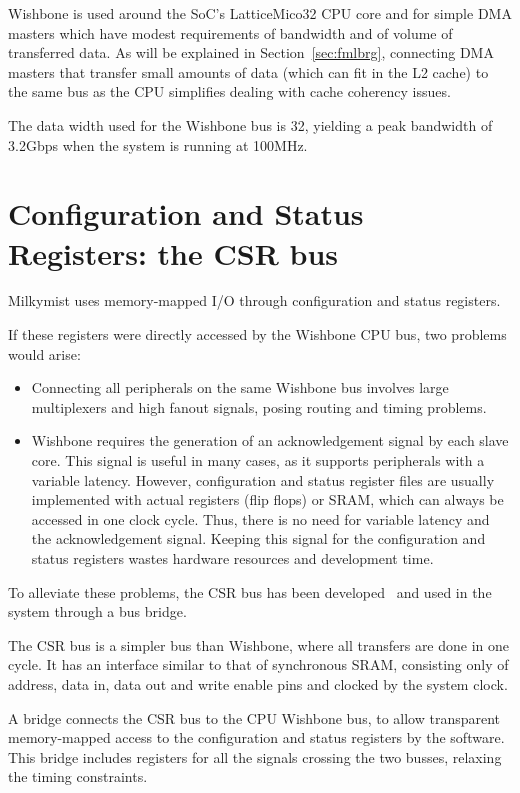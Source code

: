\documentclass[a4paper,11pt]{kthesis}
\begin{document}
Wishbone is used around the SoC's LatticeMico32 CPU core and for simple DMA masters which have modest requirements of bandwidth and of volume of transferred data. As will be explained in Section~\ref{sec:fmlbrg}, connecting DMA masters that transfer small amounts of data (which can fit in the L2 cache) to the same bus as the CPU simplifies dealing with cache coherency issues.

The data width used for the Wishbone bus is 32, yielding a peak bandwidth of 3.2Gbps when the system is running at 100MHz.

\section{Configuration and Status Registers: the CSR bus}
Milkymist uses memory-mapped I/O through configuration and status registers.

If these registers were directly accessed by the Wishbone CPU bus, two problems would arise:
\begin{itemize}
\item Connecting all peripherals on the same Wishbone bus involves large multiplexers and high fanout signals, posing routing and timing problems.
\item Wishbone requires the generation of an acknowledgement signal by each slave core. This signal is useful in many cases, as it supports peripherals with a variable latency. However, configuration and status register files are usually implemented with actual registers (flip flops) or SRAM, which can always be accessed in one clock cycle. Thus, there is no need for variable latency and the acknowledgement signal. Keeping this signal for the configuration and status registers wastes hardware resources and development time.
\end{itemize}

To alleviate these problems, the CSR bus has been developed~\cite{csr} and used in the system through a bus bridge.

The CSR bus is a simpler bus than Wishbone, where all transfers are done in one cycle. It has an interface similar to that of synchronous SRAM, consisting only of address, data in, data out and write enable pins and clocked by the system clock.

A bridge connects the CSR bus to the CPU Wishbone bus, to allow transparent memory-mapped access to the configuration and status registers by the software. This bridge includes registers for all the signals crossing the two busses, relaxing the timing constraints.
\end{document}
